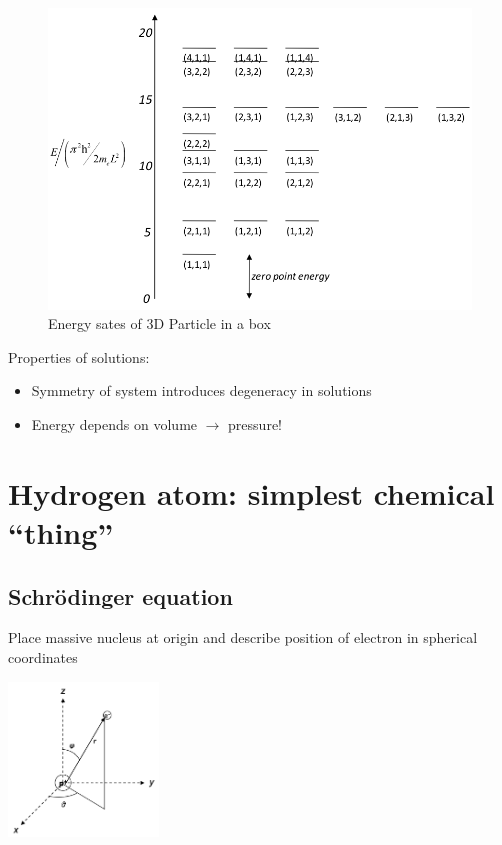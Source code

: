 \documentclass[11pt]{article}
\begin{document}
\begin{figure}[htbp]
\centering
\includegraphics[width=.9\linewidth]{./Images/3DEnergyStates.png}
\caption{Energy sates of 3D Particle in a box}
\end{figure}

Properties of solutions:
\begin{itemize}
\item Symmetry of system introduces degeneracy in solutions
\item Energy depends on volume \(\rightarrow\) pressure!
\end{itemize}

\newpage

\section{Hydrogen atom: simplest chemical ``thing''}
\label{sec:orgee7ee25}
\subsection{Schr\"{o}dinger equation}
\label{sec:org1985b41}
Place massive nucleus at origin and describe position of electron in spherical coordinates

\begin{center}
\includegraphics[width=0.3\textwidth]{./Images/spherical.png}
\end{center}
\end{document}
